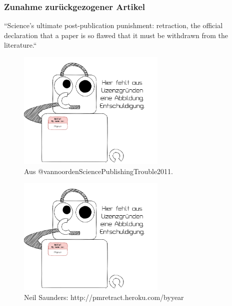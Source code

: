 \documentclass[
]{book}
\begin{document}
\hypertarget{zunahme-zuruxfcckgezogener-artikel}{%
\subsubsection{Zunahme zurückgezogener Artikel}\label{zunahme-zuruxfcckgezogener-artikel}}

``Science's ultimate post-publication punishment: retraction, the official declaration that a paper is so flawed that it must be withdrawn from the literature.``

\begin{figure}

{\centering \includegraphics[width=200pt]{imgs/copyright} 

}

\caption{Aus @vannoordenSciencePublishingTrouble2011.}\label{fig:unnamed-chunk-197}
\end{figure}

\begin{figure}

{\centering \includegraphics[width=200pt]{imgs/copyright} 

}

\caption{Neil Saunders: http://pmretract.heroku.com/byyear}\label{fig:unnamed-chunk-198}
\end{figure}

  
\end{document}
